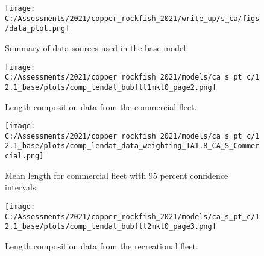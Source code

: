 \documentclass[11pt,
  english,
  a4paper,
]{article}
\begin{document}

\begin{figure}
\centering
\texttt{[image: C:/Assessments/2021/copper\_rockfish\_2021/write\_up/s\_ca/figs/data\_plot.png]}
\caption{Summary of data sources used in the base model.\label{fig:data-plot}}
\end{figure}

\tagmcend\tagstructend


\begin{figure}
\centering
\texttt{[image: C:/Assessments/2021/copper\_rockfish\_2021/models/ca\_s\_pt\_c/12.1\_base/plots/comp\_lendat\_bubflt1mkt0\_page2.png]}
\caption{Length composition data from the commercial fleet.\label{fig:com-len-data}}
\end{figure}

\tagmcend\tagstructend


\begin{figure}
\centering
\texttt{[image: C:/Assessments/2021/copper\_rockfish\_2021/models/ca\_s\_pt\_c/12.1\_base/plots/comp\_lendat\_data\_weighting\_TA1.8\_CA\_S\_Commercial.png]}
\caption{Mean length for commercial fleet with 95 percent confidence intervals.\label{fig:mean-com-len-data}}
\end{figure}

\tagmcend\tagstructend


\begin{figure}
\centering
\texttt{[image: C:/Assessments/2021/copper\_rockfish\_2021/models/ca\_s\_pt\_c/12.1\_base/plots/comp\_lendat\_bubflt2mkt0\_page3.png]}
\caption{Length composition data from the recreational fleet.\label{fig:rec-len-data}}
\end{figure}

\tagmcend\tagstructend

\end{document}
